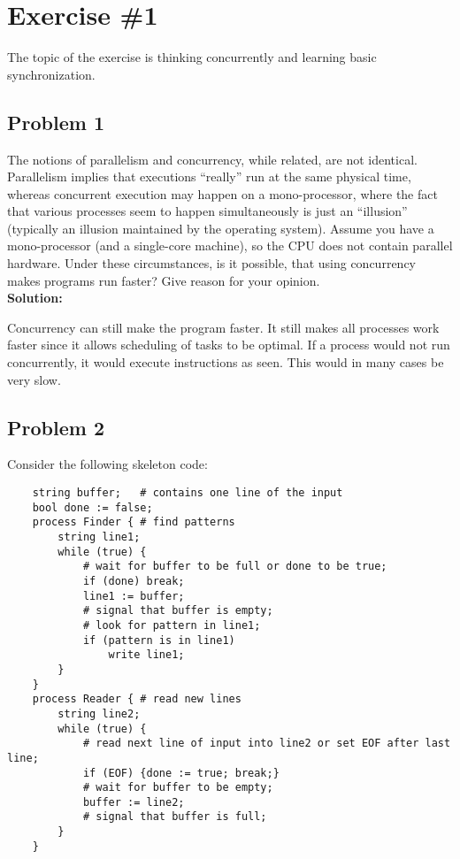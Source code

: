 \section{Exercise \#1}

The topic of the exercise is thinking concurrently and learning basic synchronization. 

\subsection{Problem 1}

The notions of parallelism and concurrency, while
related, are not identical. Parallelism implies that executions “really” run at the same physical
time, whereas concurrent execution may happen on a mono-processor, where the fact that various
processes seem to happen simultaneously is just an “illusion” (typically an illusion maintained
by the operating system). Assume you have a mono-processor (and a single-core machine), so the CPU does not contain
parallel hardware. Under these circumstances, is it possible, that using concurrency makes
programs run faster? Give reason for your opinion. \\ 

\textbf{Solution:}

Concurrency can still make the program faster. 
It still makes all processes work faster since it allows scheduling of tasks to be optimal.
If a process would not run concurrently, it would execute instructions as seen.
This would in many cases be very slow.


\subsection{Problem 2}

Consider the following skeleton code:

\begin{lstlisting}
    string buffer;   # contains one line of the input
    bool done := false;
    process Finder { # find patterns
        string line1;
        while (true) {
            # wait for buffer to be full or done to be true;
            if (done) break;
            line1 := buffer;
            # signal that buffer is empty;
            # look for pattern in line1;
            if (pattern is in line1)
                write line1;
        }
    }
    process Reader { # read new lines
        string line2;
        while (true) {
            # read next line of input into line2 or set EOF after last line;
            if (EOF) {done := true; break;}
            # wait for buffer to be empty;
            buffer := line2;
            # signal that buffer is full;
        }
    }
\end{lstlisting}


